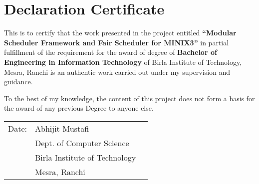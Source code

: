 \chapter*{Declaration Certificate}

This is to certify that the work presented in the project entitled \textbf{``Modular Scheduler Framework and Fair Scheduler  for MINIX3''}
in partial fulfillment of the requirement for the award of degree of 
\textbf{Bachelor of Engineering in Information Technology} of Birla Institute
of Technology, Mesra, Ranchi is an authentic work carried out under my supervision and guidance.

To the best of my knowledge, the content of this project does not form a basis for the award of any previous Degree to anyone else.

\vspace{5\baselineskip}

\begin{tabular}{p{} lp{}}
Date: &Abhijit Mustafi\\
&Dept. of Computer Science\\
&Birla Institute of Technology\\
&Mesra, Ranchi
\end{tabular}
